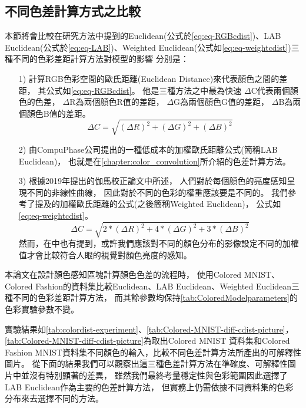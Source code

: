 \documentclass[class=NCU\_thesis, crop=false]{standalone}
\begin{document}
    \subsection{不同色差計算方式之比較}
    \label{chapter:diff-colordist-compare}
    本節將會比較在研究方法中提到的Euclidean(公式於\cref{eq:eq-RGBcdist})、LAB Euclidean(公式於\cref{eq:eq-LAB})、Weighted Euclidean(公式如\cref{eq:eq-weightcdist})三種不同的色彩差距計算方法對模型的影響
    分別是：
    \begin{itemize}
      \item [1)] 
        計算RGB色彩空間的歐氏距離(Euclidean Distance)來代表顏色之間的差距，
        其公式如\cref{eq:eq-RGBcdist}。
        他是三種方法之中最為快速
        $\Delta$C代表兩個顏色的色差，
        $\Delta$R為兩個顏色R值的差距，
        $\Delta$G為兩個顏色G值的差距，
        $\Delta$B為兩個顏色B值的差距。
        \begin{equation}
        \label{eq:eq-RGBcdist}
            \Delta C = \sqrt{(\Delta R)^2 + (\Delta G)^2 + (\Delta B)^2}
        \end{equation}

      \item [2)]
        由CompuPhase公司提出的一種低成本的加權歐氏距離公式\cite{LABformula}(簡稱LAB Euclidean)，
        也就是在\cref{chapter:color_convolution}所介紹的色差計算方法。

      \item [3)]
        根據2019年提出的伽馬校正論文\cite{GammaCorrection}中所述，
        人們對於每個顏色的亮度感知呈現不同的非線性曲線，
        因此對於不同的色彩的權重應該要是不同的。
        我們參考了\cite{LABformula}提及的加權歐氏距離的公式(之後簡稱Weighted Euclidean)，
        公式如\cref{eq:eq-weightcdist}。
        \begin{equation}
        \label{eq:eq-weightcdist}
            \Delta C = \sqrt{2 * (\Delta R)^2 + 4 * (\Delta G)^2 + 3 * (\Delta B)^2}
        \end{equation}
        然而，在\cite{LABformula}中也有提到，或許我們應該對不同的顏色分布的影像設定不同的加權值才會比較符合人眼的視覺對顏色亮度的感知。
    \end{itemize}

    本論文在設計顏色感知區塊計算顏色色差的流程時，
    使用Colored MNIST、Colored Fashion的資料集比較Euclidean、LAB Euclidean、Weighted Euclidean三種不同的色彩差距計算方法，
    而其餘參數均保持\cref{tab:ColoredModelparameters}的色彩實驗參數不變。

	實驗結果如\cref{tab:colordist-experiment}、\cref{tab:Colored-MNIST-diff-cdist-picture}，
    \cref{tab:Colored-MNIST-diff-cdist-picture}為取出Colored MNIST 資料集和Colored Fashion MNIST資料集不同顏色的輸入，比較不同色差計算方法所產出的可解釋性圖片。
	從下面的結果我們可以觀察出這三種色差計算方法在準確度、可解釋性圖片中並沒有特別顯著的差異，
	雖然我們最終考量穩定性與色彩範圍因此選擇了LAB Euclidean作為主要的色差計算方法，
    但實務上仍需依據不同資料集的色彩分布來去選擇不同的方法。
\end{document}
